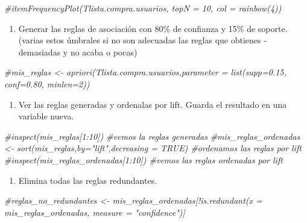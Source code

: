 \documentclass[
]{book}
\newenvironment{Shaded}{\begin{snugshade}}{\end{snugshade}}
\newcommand{\CommentTok}[1]{\textcolor[rgb]{0.56,0.35,0.01}{\textit{#1}}}
\providecommand{\tightlist}{%
  \setlength{\itemsep}{0pt}\setlength{\parskip}{0pt}}
\begin{document}
\begin{Shaded}
\begin{Highlighting}[]
\CommentTok{\#itemFrequencyPlot(Tlista.compra.usuarios, topN = 10, col = rainbow(4))}
\end{Highlighting}
\end{Shaded}

\begin{enumerate}
\def\labelenumi{\arabic{enumi}.}
\setcounter{enumi}{19}
\tightlist
\item
  Generar las reglas de asociación con 80\% de confianza y 15\% de soporte. (varias estos úmbrales si no son adecuadas las reglas que obtienes - demasiadas y no acaba o pocas)
\end{enumerate}

\begin{Shaded}
\begin{Highlighting}[]
\CommentTok{\#mis\_reglas \textless{}{-} apriori(Tlista.compra.usuarios,parameter = list(supp=0.15, conf=0.80, minlen=2))}
\end{Highlighting}
\end{Shaded}

\begin{enumerate}
\def\labelenumi{\arabic{enumi}.}
\setcounter{enumi}{20}
\tightlist
\item
  Ver las reglas generadas y ordenalas por lift. Guarda el resultado en una variable nueva.
\end{enumerate}

\begin{Shaded}
\begin{Highlighting}[]
\CommentTok{\#inspect(mis\_reglas[1:10]) \#vemos la reglas generadas}
\CommentTok{\#mis\_reglas\_ordenadas \textless{}{-} sort(mis\_reglas,by="lift",decreasing = TRUE) \#ordenamos las reglas por lift}
\CommentTok{\#inspect(mis\_reglas\_ordenadas[1:10]) \#vemos las reglas ordenadas por lift}
\end{Highlighting}
\end{Shaded}

\begin{enumerate}
\def\labelenumi{\arabic{enumi}.}
\setcounter{enumi}{21}
\tightlist
\item
  Elimina todas las reglas redundantes.
\end{enumerate}

\begin{Shaded}
\begin{Highlighting}[]
\CommentTok{\#reglas\_no\_redundantes \textless{}{-} mis\_reglas\_ordenadas[!is.redundant(x = mis\_reglas\_ordenadas, measure = "confidence")]}
\end{Highlighting}
\end{Shaded}
\end{document}
